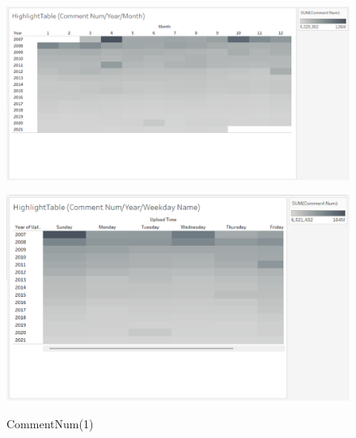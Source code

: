 \documentclass[submit,techrep,noauthor]{ipsj}
\begin{document}
\begin{figure}[h]
\begin{minipage}[b]{0.49\columnwidth}
  \end{minipage}
  \begin{minipage}[b]{0.49\columnwidth}
    \centering
    \includegraphics[width=\columnwidth]{./eps/HighlightTable_CommentNum_YearMonth.eps}
    \label{fig:highlighttable_comment_num_yearmonth}
  \end{minipage}
  \begin{minipage}[b]{0.49\columnwidth}
    \centering
    \includegraphics[width=\columnwidth]{./eps/HighlightTable_CommentNum_YearWeekdayName.eps}
    \label{fig:highlighttable_comment_num_yearweekdayname}
  \end{minipage}
\vspace{-1.0zh}
  \caption{CommentNum(1)}
  \label{fig:highlighttable_comment_num_year}
\vspace{-1.0zh}
\end{figure}
%
\vspace{-2.5zh}
%
\end{document}

